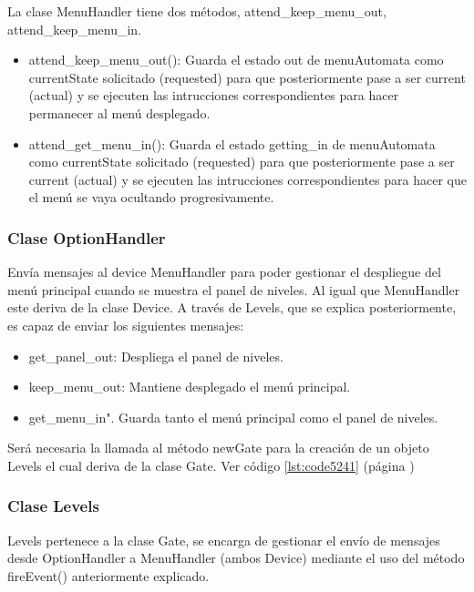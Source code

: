 La clase MenuHandler tiene dos métodos, attend\_keep\_menu\_out, attend\_keep\_menu\_in.

\begin{itemize}
 \item attend\_keep\_menu\_out(): Guarda el estado out de menuAutomata como currentState solicitado 
 (requested) para que posteriormente pase a ser current (actual) y se ejecuten las intrucciones 
 correspondientes para hacer permanecer al menú desplegado.

 \item attend\_get\_menu\_in(): Guarda el estado getting\_in de menuAutomata como currentState 
 solicitado (requested)  para que posteriormente pase a ser current (actual) y se ejecuten las 
 intrucciones correspondientes para hacer que el menú se vaya ocultando progresivamente.
\end{itemize}

\subsubsection{Clase OptionHandler}
\label{subsubsection:option_handler}

Envía mensajes al device MenuHandler para poder gestionar el despliegue del menú principal cuando se muestra el panel de niveles. 
Al igual que MenuHandler este deriva de la clase Device. A través de Levels, que se explica posteriormente, es capaz de enviar 
los siguientes mensajes:
\begin{itemize}
 \item get\_panel\_out: Despliega el panel de niveles.

 \item keep\_menu\_out: Mantiene desplegado el menú principal.

 \item get\_menu\_in". Guarda tanto el menú principal como el panel de niveles.
\end{itemize}

Será necesaria la llamada al método newGate para la creación de un objeto Levels el cual deriva de la clase Gate. 
Ver código \ref{lst:code5241} (página \pageref{lst:code5241})


\subsubsection{Clase Levels}
\label{subsubsection:levels}

Levels pertenece a la clase Gate, se encarga de gestionar el envío de mensajes desde OptionHandler a MenuHandler
(ambos Device) mediante el uso del método fireEvent() anteriormente explicado.

